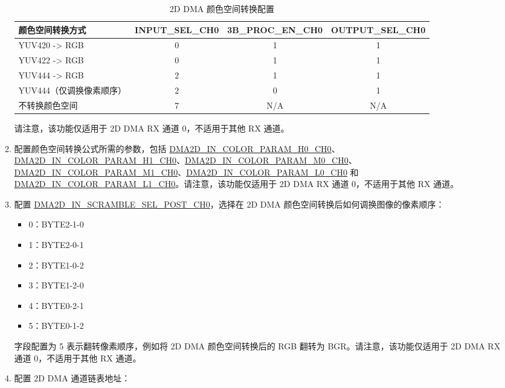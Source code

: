 \documentclass[main\_\_CN.tex]{subfiles}
\begin{document}
\begin{enumerate}
\begin{enumerate}
\begin{longtable}{ | l | c | c | c | }
            \caption{2D DMA 颜色空间转换配置} \label{tab:de_csc}
            \\ \hline
            \rowcolor{lightgray}
            \textbf{颜色空间转换方式} & \textbf{INPUT\_SEL\_CH0}  &  \textbf{3B\_PROC\_EN\_CH0} &  \textbf{OUTPUT\_SEL\_CH0}  \\ \hline
            YUV420 -> RGB &  0  &  1  &  1 \\ \hline
            YUV422 -> RGB &  0  &  1  &  1 \\ \hline
            YUV444 -> RGB &  2  &  1  &  1 \\ \hline
            YUV444（仅调换像素顺序） &  2  &  0  &  1 \\ \hline
            不转换颜色空间 &  7  &  N/A  &  N/A \\ \hline
            \end{longtable}
        请注意，该功能仅适用于 2D DMA RX 通道 0，不适用于其他 RX 通道。
        \item 配置颜色空间转换公式所需的参数，包括 \hyperref[fielddesc:DMA2DINCOLORPARAMH0CH0]{DMA2D\_IN\_COLOR\_PARAM\_H0\_CH0}、\hyperref[fielddesc:DMA2DINCOLORPARAMH1CH0]{DMA2D\_IN\_COLOR\_PARAM\_H1\_CH0}、\hyperref[fielddesc:DMA2DINCOLORPARAMM0CH0]{DMA2D\_IN\_COLOR\_PARAM\_M0\_CH0}、\hyperref[fielddesc:DMA2DINCOLORPARAMM1CH0]{DMA2D\_IN\_COLOR\_PARAM\_M1\_CH0}、\hyperref[fielddesc:DMA2DINCOLORPARAML0CH0]{DMA2D\_IN\_COLOR\_PARAM\_L0\_CH0} 和 \hyperref[fielddesc:DMA2DINCOLORPARAML1CH0]{DMA2D\_IN\_COLOR\_PARAM\_L1\_CH0}。请注意，该功能仅适用于 2D DMA RX 通道 0，不适用于其他 RX 通道。
        \item 配置 \hyperref[fielddesc:DMA2DINSCRAMBLESELPOSTCH0]{DMA2D\_IN\_SCRAMBLE\_SEL\_POST\_CH0}，选择在 2D DMA 颜色空间转换后如何调换图像的像素顺序：
        \begin{itemize}
            \item 0：BYTE2-1-0
            \item 1：BYTE2-0-1
            \item 2：BYTE1-0-2
            \item 3：BYTE1-2-0
            \item 4：BYTE0-2-1
            \item 5：BYTE0-1-2
        \end{itemize}
        字段配置为 5 表示翻转像素顺序，例如将 2D DMA 颜色空间转换后的 RGB 翻转为 BGR。请注意，该功能仅适用于 2D DMA RX 通道 0，不适用于其他 RX 通道。
        \item 配置 2D DMA 通道链表地址：
        \begin{itemize}

\end{itemize}
\end{enumerate}
\end{enumerate}
\end{document}
